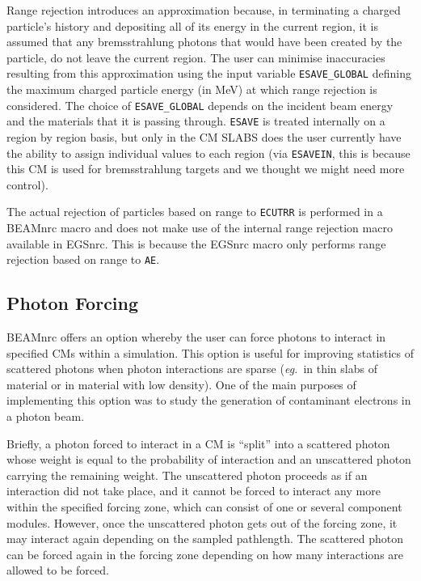 \documentclass[12pt,twoside]{article}
\newcommand{\eg}{{\em eg.}}
\begin{document}
Range rejection introduces an approximation because, in
terminating a charged particle's history and depositing all of its
energy in the current region, it is assumed that any bremsstrahlung photons that
would have been created by the particle, do not leave the current
region.  The user can minimise inaccuracies resulting from this approximation
using the input variable
\verb+ESAVE_GLOBAL+ defining the maximum charged
particle energy (in
MeV) at which
range rejection is considered.  The choice of
\verb+ESAVE_GLOBAL+ depends on
the incident beam energy and the materials that it is passing through.
\verb+ESAVE+ is treated internally on a region by region basis, but only
in the CM SLABS does the user currently have the ability to assign
individual values to each region (via \verb+ESAVEIN+,
this is because this CM is used for
bremsstrahlung targets and we thought we might need more control).

The actual rejection of particles based on range to {\tt ECUTRR}
is performed in a BEAMnrc macro and does
not make use of the internal range rejection macro available in EGSnrc.
This is because the EGSnrc macro only performs range rejection based on
range to {\tt AE}.

\subsection{Photon Forcing}

BEAMnrc offers an option whereby the user can force photons to interact
in specified CMs within  a simulation.  This option is useful for improving
statistics of scattered photons when photon
interactions are sparse (\eg\ in thin
slabs of material or in material with low density).  One of the main
purposes of implementing this option was to study the generation of
contaminant electrons in a photon beam.

Briefly, a photon forced to interact in a CM is ``split'' into a
scattered photon whose weight is equal to the probability of interaction
and an unscattered photon carrying the remaining weight.  The unscattered
photon proceeds as if an interaction did not take place, and it cannot be
forced to interact any more within the specified forcing zone, which can
consist of one or several component modules.  However, once the
unscattered photon gets out of the forcing zone, it may interact again
depending on the sampled pathlength. The scattered photon can be forced
again in the forcing zone depending on how many interactions are allowed
to be forced.
\end{document}
